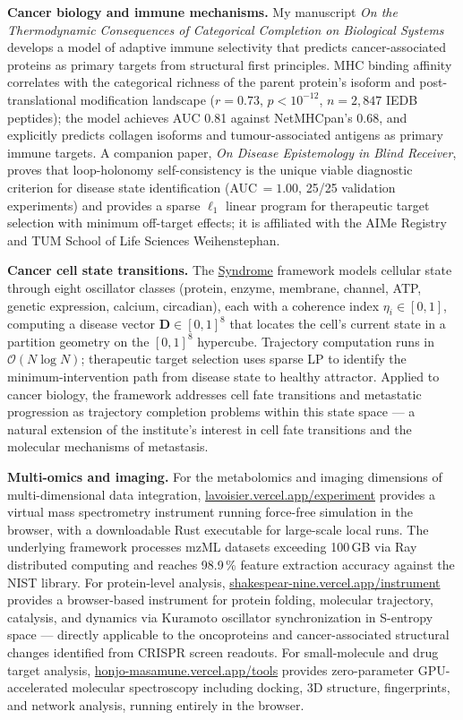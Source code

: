 \documentclass[12pt,a4paper]{article}
\begin{document}
\textbf{Cancer biology and immune mechanisms.}
My manuscript \textit{On the Thermodynamic Consequences of Categorical Completion
on Biological Systems} develops a model of adaptive immune selectivity that predicts
cancer-associated proteins as primary targets from structural first principles.
MHC binding affinity correlates with the categorical richness of the parent
protein's isoform and post-translational modification landscape
($r = 0.73$, $p < 10^{-12}$, $n = 2{,}847$ IEDB peptides); the model achieves
AUC 0.81 against NetMHCpan's 0.68, and explicitly predicts collagen isoforms and
tumour-associated antigens as primary immune targets.
A companion paper, \textit{On Disease Epistemology in Blind Receiver}, proves that
loop-holonomy self-consistency is the unique viable diagnostic criterion for
disease state identification (AUC$\,=1.00$, 25/25 validation experiments) and
provides a sparse $\ell_1$ linear program for therapeutic target selection with
minimum off-target effects; it is affiliated with the AIMe Registry and TUM
School of Life Sciences Weihenstephan.

\textbf{Cancer cell state transitions.}
The \href{https://github.com/fullscreen-triangle/syndrome}{Syndrome} framework
models cellular state through eight oscillator classes (protein, enzyme, membrane,
channel, ATP, genetic expression, calcium, circadian), each with a coherence index
$\eta_i \in [0,1]$, computing a disease vector $\mathbf{D} \in [0,1]^8$ that
locates the cell's current state in a partition geometry on the $[0,1]^8$ hypercube.
Trajectory computation runs in $\mathcal{O}(N\log N)$; therapeutic target selection
uses sparse LP to identify the minimum-intervention path from disease state to
healthy attractor. Applied to cancer biology, the framework addresses cell fate
transitions and metastatic progression as trajectory completion problems within
this state space --- a natural extension of the institute's interest in cell fate
transitions and the molecular mechanisms of metastasis.

\textbf{Multi-omics and imaging.}
For the metabolomics and imaging dimensions of multi-dimensional data integration,
\href{https://lavoisier.vercel.app/experiment}{lavoisier.vercel.app/experiment}
provides a virtual mass spectrometry instrument running force-free simulation
in the browser, with a downloadable Rust executable for large-scale local runs.
The underlying framework processes mzML datasets exceeding 100\,GB via Ray
distributed computing and reaches 98.9\,\% feature extraction accuracy against
the NIST library.
For protein-level analysis, \href{https://shakespear-nine.vercel.app/instrument}{shakespear-nine.vercel.app/instrument}
provides a browser-based instrument for protein folding, molecular trajectory,
catalysis, and dynamics via Kuramoto oscillator synchronization in S-entropy
space --- directly applicable to the oncoproteins and cancer-associated structural
changes identified from CRISPR screen readouts.
For small-molecule and drug target analysis,
\href{https://honjo-masamune.vercel.app/tools}{honjo-masamune.vercel.app/tools}
provides zero-parameter GPU-accelerated molecular spectroscopy including docking,
3D structure, fingerprints, and network analysis, running entirely in the browser.
\end{document}
